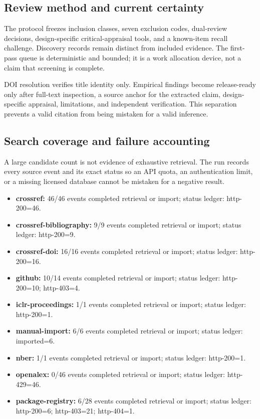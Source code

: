 \documentclass[11pt]{article}
\providecommand{\tightlist}{\setlength{\itemsep}{0pt}\setlength{\parskip}{0pt}}
\begin{document}
\hypertarget{review-method-and-current-certainty}{%
\subsection{Review method and current certainty}\label{review-method-and-current-certainty}}

The protocol freezes inclusion classes, seven exclusion codes, dual-review decisions, design-specific critical-appraisal tools, and a known-item recall challenge. Discovery records remain distinct from included evidence. The first-pass queue is deterministic and bounded; it is a work allocation device, not a claim that screening is complete.

DOI resolution verifies title identity only. Empirical findings become release-ready only after full-text inspection, a source anchor for the extracted claim, design-specific appraisal, limitations, and independent verification. This separation prevents a valid citation from being mistaken for a valid inference.

\hypertarget{search-coverage-and-failure-accounting}{%
\subsection{Search coverage and failure accounting}\label{search-coverage-and-failure-accounting}}

A large candidate count is not evidence of exhaustive retrieval. The run records every source event and its exact status so an API quota, an authentication limit, or a missing licensed database cannot be mistaken for a negative result.

\begin{itemize}
\tightlist
\item
  \textbf{crossref:} 46/46 events completed retrieval or import; status ledger: http-200=46.
\item
  \textbf{crossref-bibliography:} 9/9 events completed retrieval or import; status ledger: http-200=9.
\item
  \textbf{crossref-doi:} 16/16 events completed retrieval or import; status ledger: http-200=16.
\item
  \textbf{github:} 10/14 events completed retrieval or import; status ledger: http-200=10; http-403=4.
\item
  \textbf{iclr-proceedings:} 1/1 events completed retrieval or import; status ledger: http-200=1.
\item
  \textbf{manual-import:} 6/6 events completed retrieval or import; status ledger: imported=6.
\item
  \textbf{nber:} 1/1 events completed retrieval or import; status ledger: http-200=1.
\item
  \textbf{openalex:} 0/46 events completed retrieval or import; status ledger: http-429=46.
\item
  \textbf{package-registry:} 6/28 events completed retrieval or import; status ledger: http-200=6; http-403=21; http-404=1.
\end{itemize}
\end{document}
